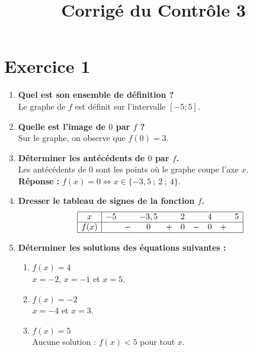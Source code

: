 \documentclass[a4paper,11pt]{article}
\title{Corrigé du Contrôle 3}
\author{}
\date{}
\begin{document}
\maketitle

\section*{Exercice 1}

\begin{enumerate}
    \item \textbf{Quel est son ensemble de définition ?} \\
    Le graphe de \( f \) est définit sur l'intervalle \([-5 ; 5]\). \\

    \item \textbf{Quelle est l’image de \( 0 \) par \( f \) ?} \\
    Sur le graphe, on observe que \( f(0) = 3 \). \\

    \item \textbf{Déterminer les antécédents de \( 0 \) par \( f \).} \\
    Les antécédents de \( 0 \) sont les points où le graphe coupe l'axe \( x \). \\
    \textbf{Réponse :} \( f(x) = 0 \iff x \in \{-3,5\ ;\ 2\ ;\ 4\} \).

    \item \textbf{Dresser le tableau de signes de la fonction \( f \).} \\

    \[
    \begin{array}{|c|ccccccccc|}
    \hline
    x & -5 & & -3,5 & & 2 & & 4 & & 5 \\
    \hline
    f(x) & & - & 0 & + & 0 & - & 0 & + & \\
    \hline
    \end{array}
    \]

    \item \textbf{Déterminer les solutions des équations suivantes :}
    \begin{enumerate}
        \item \( f(x) = 4 \) \\
        \( x = -2 \), \( x = -1 \) et $x = 5$. \\
        \item \( f(x) = -2 \) \\
        \( x = -4 \) et \( x = 3 \). \\
        \item \( f(x) = 5 \) \\
        Aucune solution : \( f(x) < 5 \) pour tout \( x \).
    \end{enumerate}


\end{enumerate}
\end{document}
